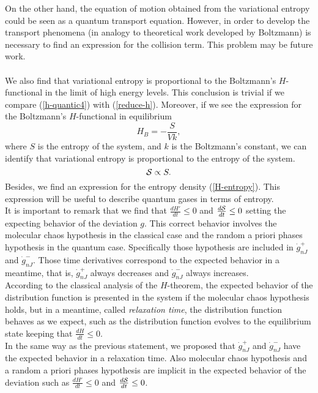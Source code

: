 On the other hand, the equation of motion obtained from the variational entropy could be seen as a quantum transport equation. However, in order to develop the transport phenomena (in analogy to theoretical work developed by Boltzmann) is necessary to find an expression for the collision term. This problem may be future work.\\
\\
We also find that variational entropy is proportional to the Boltzmann's $H$-functional in the limit of high energy levels. This conclusion is trivial if we compare (\ref{h-quantic4}) with (\ref{reduce-h}). Moreover, if we see the expression for the Boltzmann's $H$-functional in equilibrium
\begin{equation}
    H_{B}=-\frac{S}{Vk},
\end{equation}
where $S$ is the entropy of the system, and $k$ is the Boltzmann's constant, we can identify that variational entropy is proportional to the entropy of the system.\\
\begin{equation}
    \mathcal{S}\propto S.
\end{equation}
Besides, we find an expression for the entropy density (\ref{H-entropy}). This expression will be useful to describe quantum gases in terms of entropy.\\
It is important to remark that we find that $\frac{dH'}{dt}\leq 0$ and $\frac{d\mathcal{S}}{dt}\leq 0$ setting the expecting behavior of the deviation $g$. This correct behavior involves the molecular chaos hypothesis in the classical case and the random a priori phases hypothesis in the quantum case. Specifically those hypothesis are included in $\dot{g}_{nJ}^{+}$ and $\dot{g}_{nJ}^{-}$. Those time derivatives correspond to the expected behavior in a meantime, that is, $\dot{g}_{nJ}^{+}$ always decreases and $\dot{g}_{nJ}^{-}$ always increases.\\ 
According to the classical analysis of the $H$-theorem, the expected behavior of the distribution function is presented in the system if the molecular chaos hypothesis holds, but in a meantime, called \textit{relaxation time}, the distribution function behaves as we expect, such as the distribution function evolves to the equilibrium state keeping that $\frac{dH}{dt}\leq 0$.\\
In the same way as the previous statement, we proposed that $\dot{g}_{nJ}^{+}$ and $\dot{g}_{nJ}^{-}$ have the expected behavior in a relaxation time. Also molecular chaos hypothesis and a random a priori phases hypothesis are implicit in the expected behavior of the deviation such as $\frac{dH'}{dt}\leq 0$ and $\frac{d\mathcal{S}}{dt}\leq 0$.


